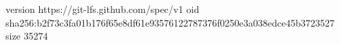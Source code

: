 version https://git-lfs.github.com/spec/v1
oid sha256:b2f73c3fa01b176f65e8df61e93576122787376f0250e3a038edce45b3723527
size 35274
